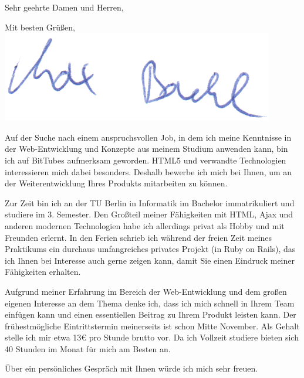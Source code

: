 \documentclass[11pt,a4paper]{moderncv}   %
\newcommand{\employer}{BitTubes}
\begin{document}
\clearpage
\recipient{\employer{}}{}
\opening{Sehr geehrte Damen und Herren,}
\closing{Mit besten Grüßen,\\
\vspace*{0.4cm}
\includegraphics{unterschrift.png}
\vspace*{-1.3cm}}
\makelettertitle

Auf der Suche nach einem anspruchsvollen Job, in dem ich meine Kenntnisse in der Web-Entwicklung und Konzepte aus meinem Studium anwenden kann, bin ich auf \employer{} aufmerksam geworden. HTML5 und verwandte Technologien interessieren mich dabei besonders. Deshalb bewerbe ich mich bei Ihnen, um an der Weiterentwicklung Ihres Produkts %
mitarbeiten zu können.

Zur Zeit bin ich an der TU Berlin in Informatik im Bachelor immatrikuliert und studiere im 3. Semester. Den Großteil meiner Fähigkeiten mit HTML, Ajax und anderen modernen Technologien habe ich allerdings privat als Hobby und mit Freunden erlernt. In den Ferien schrieb ich während der freien Zeit meines Praktikums ein durchaus umfangreiches privates Projekt (in Ruby on Rails), das ich Ihnen bei Interesse auch gerne zeigen kann, damit Sie einen Eindruck meiner Fähigkeiten erhalten.

Aufgrund meiner Erfahrung im Bereich der Web-Entwicklung und dem großen eigenen Interesse an dem Thema denke ich, dass ich mich schnell in Ihrem Team einfügen kann und einen essentiellen Beitrag zu Ihrem Produkt leisten kann. Der frühestmögliche Eintrittstermin meinerseits ist schon Mitte November. Als Gehalt stelle ich mir etwa 13€ pro Stunde brutto vor. Da ich Vollzeit studiere bieten sich 40 Stunden im Monat für mich am Besten an.

Über ein persönliches Gespräch mit Ihnen würde ich mich sehr freuen.

\makeletterclosing

\end{document}
